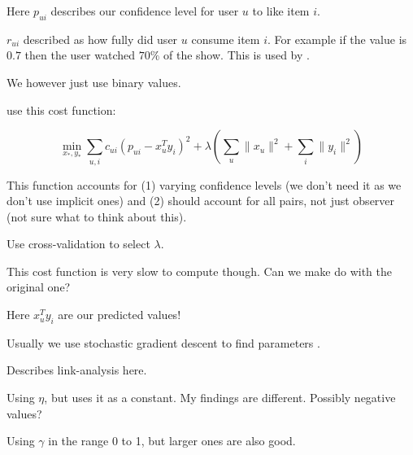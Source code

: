 Here $p_{ui}$ describes our confidence level for user $u$ to like item $i$.

$r_{ui}$ described as how fully did user $u$ consume item $i$. For example if the value is $0.7$ then the user watched $70\%$ of the show. This is used by \cite{hu2008collaborative}.

We however just use binary values.

\cite{hu2008collaborative} use this cost function:

\begin{equation}
    \min_{x_*, y_*} \sum_{u,i} c_{ui} (p_{ui} - x_{u}^T y_i)^2 + \lambda(\sum_{u} \|x_u\|^2 + \sum_{i} \|y_i\|^2)
\end{equation}

This function accounts for (1) varying confidence levels (we don't need it as we don't use implicit ones) and (2) should account for all pairs, not just observer (not sure what to think about this).

Use cross-validation to select $\lambda$.

This cost function is very slow to compute though. Can we make do with the original one?

Here $x_{u}^T y_i$ are our predicted values!

Usually we use stochastic gradient descent to find parameters \cite{hu2008collaborative}.

Describes link-analysis here.


Using $\eta$, but uses it as a constant. My findings are different. Possibly negative values?

Using $\gamma$ in the range 0 to 1, but larger ones are also good.


